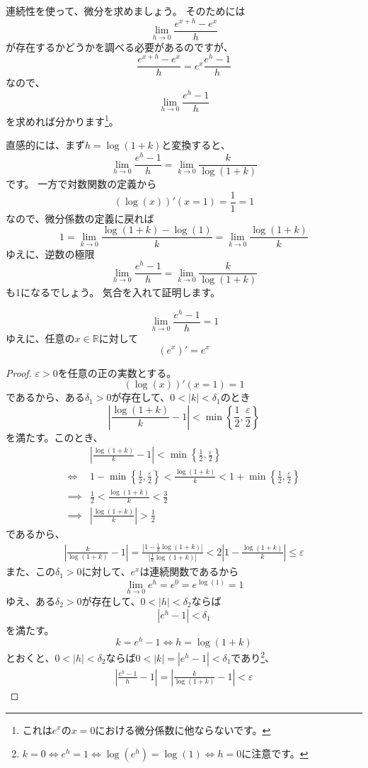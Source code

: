 連続性を使って、微分を求めましょう。
そのためには
\[
  \lim_{h\to0}\frac{e^{x+h}-e^x}{h}
\]
が存在するかどうかを調べる必要があるのですが、
\[
  \frac{e^{x+h}-e^x}{h}=e^x\frac{e^h-1}{h}
\]
なので、
\[
  \lim_{h\to0}\frac{e^h-1}{h}
\]
を求めれば分かります\footnote{
  これは$e^x$の$x=0$における微分係数に他ならないです。
}。

直感的には、まず$h=\log(1+k)$と変換すると、
\[
  \lim_{h\to0}\frac{e^h-1}{h}=\lim_{k\to0}\frac{k}{\log(1+k)}
\]
です。
一方で対数関数の定義から
\[
  (\log(x))'(x=1)=\frac{1}{1}=1
\]
なので、微分係数の定義に戻れば
\[
  1=\lim_{k\to0}\frac{\log(1+k)-\log(1)}{k}=\lim_{k\to0}\frac{\log(1+k)}{k}
\]
ゆえに、逆数の極限
\[
  \lim_{h\to0}\frac{e^h-1}{h}=\lim_{k\to0}\frac{k}{\log(1+k)}
\]
も1になるでしょう。
気合を入れて証明します。
\begin{theorem}
  \[
    \lim_{h\to0}\frac{e^h-1}{h}=1
  \]
  ゆえに、任意の$x\in\mathbb{R}$に対して
  \[
    (e^x)'=e^x
  \]
\end{theorem}
\begin{proof}
  $\varepsilon>0$を任意の正の実数とする。
  \[
    (\log(x))'(x=1)=1
  \]
  であるから、ある$\delta_1>0$が存在して、$0<|k|<\delta_1$のとき
  \[
    \left|\frac{\log(1+k)}{k}-1\right|<\min\left\{\frac12,\frac{\varepsilon}{2}\right\}
  \]
  を満たす。このとき、
  \begin{align*}
    &\left|\frac{\log(1+k)}{k}-1\right|<\min\left\{\frac12,\frac{\varepsilon}{2}\right\}\\
    \iff&1-\min\left\{\frac12,\frac{\varepsilon}{2}\right\}<\frac{\log(1+k)}{k}<1+\min\left\{\frac12,\frac{\varepsilon}{2}\right\}\\
    \implies&\frac12<\frac{\log(1+k)}{k}<\frac32\\
    \implies&\left|\frac{\log(1+k)}{k}\right|>\frac12
  \end{align*}
  であるから、
  \begin{align*}
    \left|\frac{k}{\log(1+k)}-1\right|=\frac{|1-\frac1k\log(1+k)|}{|\frac1k\log(1+k)|}<2\left|1-\frac{\log(1+k)}{k}\right|\leq\varepsilon
  \end{align*}
  また、この$\delta_1>0$に対して、$e^x$は連続関数であるから
  \[
    \lim_{h\to0}e^h=e^0=e^{\log(1)}=1
  \]
  ゆえ、ある$\delta_2>0$が存在して、$0<|h|<\delta_2$ならば
  \[
    |e^h-1|<\delta_1
  \]
  を満たす。
  \[
    k=e^h-1 \iff h=\log(1+k)
  \]
  とおくと、$0<|h|<\delta_2$ならば$0<|k|=|e^h-1|<\delta_1$であり\footnote{
    $k=0 \iff e^h=1 \iff \log(e^h)=\log(1) \iff h=0$に注意です。
  }、
  \begin{align*}
    \left|\frac{e^h-1}{h}-1\right|=\left|\frac{k}{\log(1+k)}-1\right|<\varepsilon
  \end{align*}
\end{proof}

